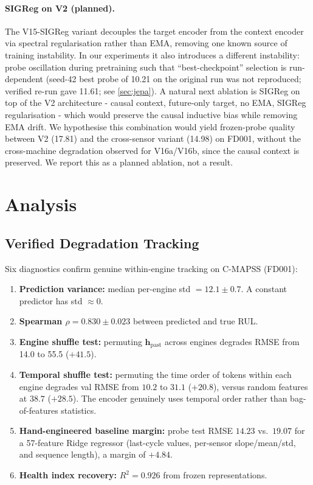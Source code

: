 \documentclass{article}
\newcommand{\h}{\mathbf{h}}
\begin{document}
\paragraph{SIGReg on V2 (planned).} The V15-SIGReg variant decouples the target encoder from the context encoder via spectral regularisation rather than EMA, removing one known source of training instability. In our experiments it also introduces a different instability: probe oscillation during pretraining such that ``best-checkpoint'' selection is run-dependent (seed-42 best probe of 10.21 on the original run was not reproduced; verified re-run gave 11.61; see \cref{sec:jepa}). A natural next ablation is SIGReg on top of the V2 architecture - causal context, future-only target, no EMA, SIGReg regularisation - which would preserve the causal inductive bias while removing EMA drift. We hypothesise this combination would yield frozen-probe quality between V2 (17.81) and the cross-sensor variant (14.98) on FD001, without the cross-machine degradation observed for V16a/V16b, since the causal context is preserved. We report this as a planned ablation, not a result.

\section{Analysis}
\label{sec:analysis}

\subsection{Verified Degradation Tracking}
\label{sec:verification}

Six diagnostics confirm genuine within-engine tracking on C-MAPSS (FD001):
\begin{enumerate}[nosep]
  \item \textbf{Prediction variance:} median per-engine std $= 12.1 \pm 0.7$. A constant predictor has std $\approx 0$.
  \item \textbf{Spearman $\rho = 0.830 \pm 0.023$} between predicted and true RUL.
  \item \textbf{Engine shuffle test:} permuting $\h_\text{past}$ across engines degrades RMSE from 14.0 to 55.5 ($+41.5$).
  \item \textbf{Temporal shuffle test:} permuting the time order of tokens within each engine degrades val RMSE from $10.2$ to $31.1$ ($+20.8$), versus random features at $38.7$ ($+28.5$). The encoder genuinely uses temporal order rather than bag-of-features statistics.
  \item \textbf{Hand-engineered baseline margin:} probe test RMSE $14.23$ vs.\ $19.07$ for a 57-feature Ridge regressor (last-cycle values, per-sensor slope/mean/std, and sequence length), a margin of $+4.84$.
  \item \textbf{Health index recovery:} $R^2 = 0.926$ from frozen representations.
\end{enumerate}
\end{document}
